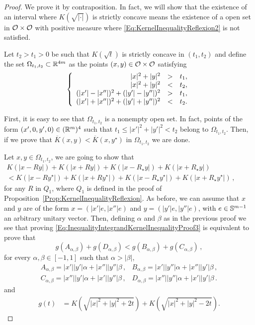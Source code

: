 \begin{proof}
We prove it by contraposition. In fact, we will show that the existence of an interval where $K(\sqrt{|\cdot|})$ is strictly concave means the existence of a open set in $\mathcal{O} \times \mathcal{O}$ with positive measure where \eqref{Eq:KernelInequalityReflexion2} is not satisfied.

Let $t_2>t_1>0$ be such that $K(\sqrt{t})$ is strictly concave in $(t_1,t_2)$ and define the set $\Omega_{t_1,t_2}\subset \mathbb{R}^{4m}$ as the points $(x,y)\in \mathcal{O}\times \mathcal{O}$ satisfying
\begin{equation}
\label{eq:OmegaSetDefinition}
\left\{\begin{array}{rcll}
  |x|^2+|y|^2&>&t_1,\\
  |x|^2+|y|^2&<&t_2,\\
  (|x'|-|x''|)^2+(|y'|-|y''|)^2&>&t_1,\\
  (|x'|+|x''|)^2+(|y'|+|y''|)^2&<&t_2.
\end{array} \right.
\end{equation}

First, it is easy to see that $\Omega_{t_1,t_2}$ is a nonempty open set. In fact, points of the form $(x',0,y',0)\in (\mathbb{R}^m)^4$ such that $t_1\leq |x'|^2+|y'|^2<t_2$ belong to $\Omega_{t_1,t_2}$. Then, if we prove that $\overline{K}(x,y) < \overline{K}(x, y^\star)$ in $\Omega_{t_1,t_2}$ we are done.

Let $x,y\in \Omega_{t_1,t_2}$, we are going to show that
\begin{equation}
	\label{Eq:InequalityIntegrandKernelInequalityProof3}
	\begin{split}
	K(|x - R y|) + K(|x + R y|) + K(|x - R_\star y|) + K(|x + R_\star y|) 
    \quad \quad \quad \quad \quad \quad \quad \quad
	 \\
    <
	K(|x - R y^\star|) + K(|x + R y^\star|)+K(|x - R_\star y^\star|) + K(|x + R_\star y^\star|)\,,
	\end{split}
\end{equation}
for any $R$ in $Q_1$, where $Q_1$ is defined in the proof of Proposition~\ref{Prop:KernelInequalityReflexion}. As before, we can assume that $x$ and $y$ are of the form $x = (|x'|e, |x''|e)$ and $y = (|y'|e, |y''|e)$, with $e \in \mathbb{S}^{m-1}$ an arbitrary unitary vector. Then, defining $\alpha$ and $\beta$ as in the previous proof we see that proving \eqref{Eq:InequalityIntegrandKernelInequalityProof3} is equivalent to prove that
\begin{equation}
  \label{Eq:InequalityIntegrandKernelInequalityProof4}
  g(A_{\alpha,\beta}) + g(D_{\alpha,\beta}) < g(B_{\alpha,\beta}) + g(C_{\alpha,\beta})\,,
\end{equation}
for every $\alpha, \beta \in [-1,1]$ such that $\alpha>|\beta|$,
$$
	\begin{array}{cc}
	A_{\alpha,\beta} = |x'||y'|  \alpha + |x''||y''|\beta \,, &
	B_{\alpha,\beta} = |x'||y''| \alpha + |x''||y'| \beta \,, \\
	C_{\alpha,\beta} = |x''||y'| \alpha + |x'||y''| \beta \,, &
	D_{\alpha,\beta} = |x''||y''|\alpha + |x'||y'|  \beta \,.
	\end{array}
	$$
and
\begin{align*}
g(t) &= K\left( \sqrt{|x|^2+|y|^2+2t} \right) + K\left( \sqrt{|x|^2+|y|^2-2t} \right).
\end{align*}


\end{proof}

